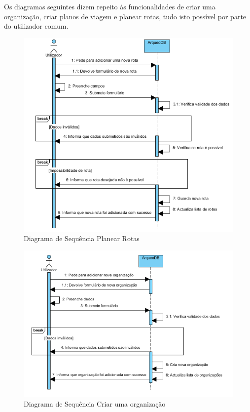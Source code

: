 ﻿\documentclass[12pt,a4paper]{article}
\begin{document}
\clearpage
Os diagramas seguintes dizem repeito às funcionalidades de criar uma organização, criar planos de viagem e planear rotas, tudo isto possível por parte do utilizador comum.\\

\begin{figure}[h!]
\centering
\includegraphics[scale=1]{sequencia/planearrotas}
\caption{Diagrama de Sequência Planear Rotas} 
\end{figure}


\begin{figure}[h!]
\centering
\includegraphics[scale=0.8]{sequencia/criarorganizacao}
\caption{Diagrama de Sequência Criar uma organização} 
\end{figure}
\end{document}
